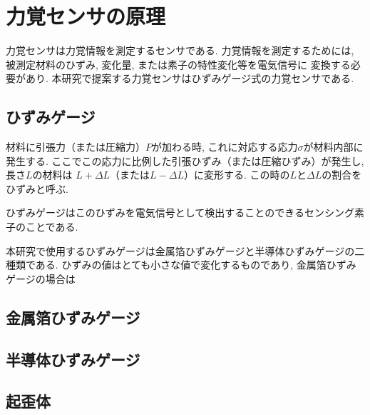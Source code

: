 \section{力覚センサの原理}
力覚センサは力覚情報を測定するセンサである. 
力覚情報を測定するためには, 被測定材料のひずみ, 変化量, または素子の特性変化等を電気信号に
変換する必要があり. 
本研究で提案する力覚センサはひずみゲージ式の力覚センサである. 

\subsection{ひずみゲージ}
材料に引張力（または圧縮力）$P$が加わる時, これに対応する応力$σ$が材料内部に発生する.
ここでこの応力に比例した引張ひずみ（または圧縮ひずみ）が発生し, 長さ$L$の材料は
$L + \Delta L$（または$L - \Delta L$）に変形する. 
この時の$L$と$\Delta L$の割合をひずみと呼ぶ. 

ひずみゲージはこのひずみを電気信号として検出することのできるセンシング素子のことである. 

本研究で使用するひずみゲージは金属箔ひずみゲージと半導体ひずみゲージの二種類である. 
ひずみの値はとても小さな値で変化するものであり, 
金属箔ひずみゲージの場合は

\subsection*{金属箔ひずみゲージ}
\subsection*{半導体ひずみゲージ}

\subsection{起歪体}



